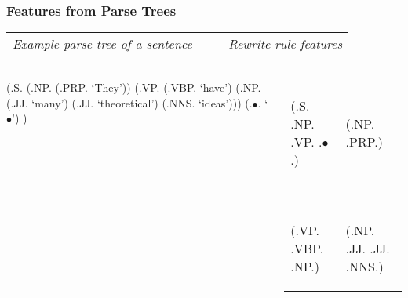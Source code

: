 \documentclass[handouti]{beamer}
\begin{document}
\begin{frame}[fragile]
    \frametitle{Features from Parse Trees}
    {\small
    \begin{tabular}{cc}
        \emph{ Example parse tree of a sentence } 
        &
        \emph{ ~~~ Rewrite rule features} \\
    \end{tabular}
     \begin{columns}[c]
        \begin{column}{.5\textwidth}
            \begin{parsetree}
              (.S. (.NP. (.PRP. `They')) (.VP. (.VBP. `have')
              (.NP. (.JJ. `many') (.JJ. `theoretical') (.NNS. `ideas')))
              (.$\bullet$. `$\bullet$') )
            \end{parsetree}
            \vfill
        \end{column}
        \begin{column}{.5\textwidth}
            \begin{tabular}{ll}
                \begin{parsetree}
                    (.S. .NP. .VP. .$\bullet$.)
                \end{parsetree} &
                \begin{parsetree}
                    (.NP. .PRP.)
                \end{parsetree} \\
                ~ & ~ \\ %
                \begin{parsetree}
                    (.VP. .VBP. .NP.)
                \end{parsetree} &
                \begin{parsetree}
                    (.NP. .JJ. .JJ. .NNS.)
                \end{parsetree} \\
            \end{tabular}
        \end{column}
    \end{columns}
    }
\end{frame}
\end{document}
